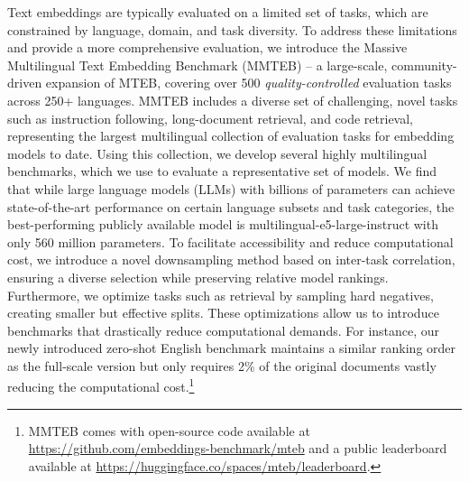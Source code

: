 Text embeddings are typically evaluated on a limited set of tasks, which are constrained by language, domain, and task diversity. To address these limitations and provide a more comprehensive evaluation, we introduce the Massive Multilingual Text Embedding Benchmark (MMTEB) -- a large-scale, community-driven expansion of MTEB, covering over 500 \textit{quality-controlled} evaluation tasks across 250+ languages. MMTEB includes a diverse set of challenging, novel tasks such as instruction following, long-document retrieval, and code retrieval,
representing the largest multilingual collection of evaluation tasks for embedding models to date.
Using this collection, we develop several highly multilingual benchmarks, which we use to evaluate a representative set of models. We find that while large language models (LLMs) with billions of parameters can achieve state-of-the-art performance on certain language subsets and task categories, the best-performing publicly available model is multilingual-e5-large-instruct with only 560 million parameters. To facilitate accessibility and reduce computational cost, we introduce a novel downsampling method based on inter-task correlation, ensuring a diverse selection while preserving relative model rankings.
Furthermore, we optimize tasks such as retrieval by sampling hard negatives, creating smaller but effective splits. These optimizations allow us to introduce benchmarks that drastically reduce computational demands. For instance, our newly introduced zero-shot English benchmark maintains a similar ranking order as the full-scale version but only requires 2\% of the original documents vastly reducing the computational cost.\footnote{MMTEB comes with open-source code available at \url{https://github.com/embeddings-benchmark/mteb}
and a public leaderboard available at
\url{https://huggingface.co/spaces/mteb/leaderboard}.}